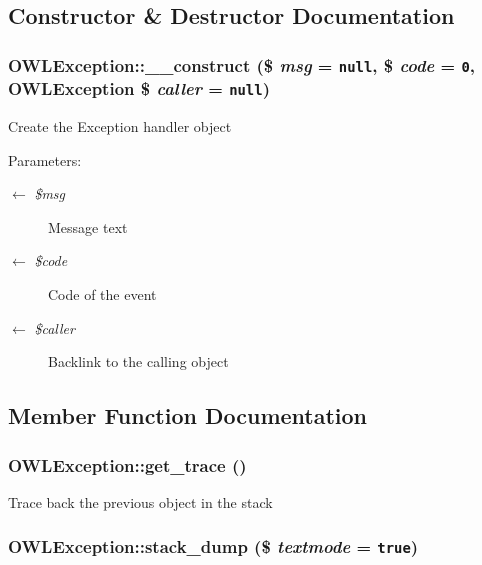 \subsection{Constructor \& Destructor Documentation}
\hypertarget{classOWLException_02821b324b42b7818c3fefe7638444e7}{
\subsubsection{\setlength{\rightskip}{0pt plus 5cm}OWLException::\_\-\_\-construct (\$ {\em msg} = {\tt null}, \$ {\em code} = {\tt 0}, {\bf OWLException} \$ {\em caller} = {\tt null})}}
\label{classOWLException_02821b324b42b7818c3fefe7638444e7}


Create the Exception handler object

\begin{Desc}
\item[Parameters:]
\begin{description}
\item[\mbox{$\leftarrow$} {\em \$msg}]Message text \item[\mbox{$\leftarrow$} {\em \$code}]Code of the event \item[\mbox{$\leftarrow$} {\em \$caller}]Backlink to the calling object \end{description}
\end{Desc}


\subsection{Member Function Documentation}
\hypertarget{classOWLException_bec096884c369f08040443561ac3b164}{
\subsubsection{\setlength{\rightskip}{0pt plus 5cm}OWLException::get\_\-trace ()}}
\label{classOWLException_bec096884c369f08040443561ac3b164}


Trace back the previous object in the stack \hypertarget{classOWLException_cf2b94859fdebcefc22e8a75ac1a670d}{
\subsubsection{\setlength{\rightskip}{0pt plus 5cm}OWLException::stack\_\-dump (\$ {\em textmode} = {\tt true})}}
\label{classOWLException_cf2b94859fdebcefc22e8a75ac1a670d}


